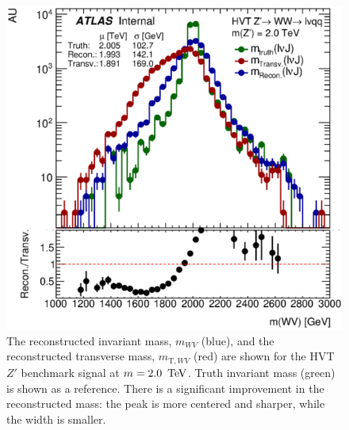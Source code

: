 \begin{figure}[hp]
  \begin{center}
\includegraphics[width=0.6\linewidth]{figures/Appendix/h_m_mt}
     \end{center}
  \caption[Comparison between reconstructed invariant mass and reconstructed transverse mass]{The reconstructed invariant mass, $m_{WV}$ (blue), and the reconstructed transverse mass, $m_{\mathrm{T}, WV}$ (red) are shown for the HVT $Z'$ benchmark signal at $m=2.0\,\TeV$. Truth invariant mass (green) is shown as a reference. There is a significant improvement in the reconstructed mass: the peak is more centered and sharper, while the width is smaller.}
  \label{fig:mass_vs_mt}
\end{figure}



